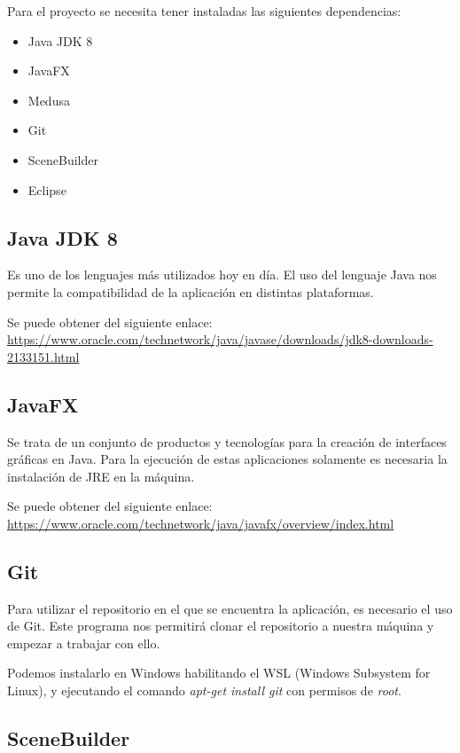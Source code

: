 Para el proyecto se necesita tener instaladas las siguientes dependencias:

\begin{itemize}
\item
Java JDK 8
\item
JavaFX
\item
Medusa\cite{javafx:medusa}
\item
Git
\item
SceneBuilder
\item
Eclipse
\end{itemize}

\subsection{Java JDK 8}

Es uno de los lenguajes más utilizados hoy en día. El uso del lenguaje Java nos permite la compatibilidad de la aplicación en distintas plataformas.

Se puede obtener del siguiente enlace: \url{https://www.oracle.com/technetwork/java/javase/downloads/jdk8-downloads-2133151.html}

\subsection{JavaFX}

Se trata de un conjunto de productos y tecnologías para la creación de interfaces gráficas en Java. Para la ejecución de estas aplicaciones solamente es necesaria la instalación de JRE en la máquina.

Se puede obtener del siguiente enlace:
\url{https://www.oracle.com/technetwork/java/javafx/overview/index.html}

\subsection{Git}

Para utilizar el repositorio en el que se encuentra la aplicación, es necesario el uso de Git. Este programa nos permitirá clonar el repositorio a nuestra máquina y empezar a trabajar con ello.

Podemos instalarlo en Windows habilitando el WSL (Windows Subsystem for Linux), y ejecutando el comando \emph{apt-get install git} con permisos de \emph{root}.


\subsection{SceneBuilder}

